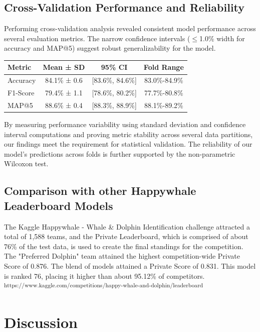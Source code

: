 \documentclass[twocolumn]{article}
\begin{document}
\subsection{Cross-Validation Performance and Reliability}

Performing cross-validation analysis revealed consistent model performance across several evaluation metrics. The narrow confidence intervals (\(\leq\)1.0\% width for accuracy and MAP@5) suggest robust generalizability for the model.

\begin{table}
\begin{tabular}{l c c c}
\hline
\textbf{Metric} & \textbf{Mean ± SD} & \textbf{95\% CI} & \textbf{Fold Range} \\ \hline
Accuracy & 84.1\% ± 0.6 & [83.6\%, 84.6\%] & 83.0\%-84.9\% \\
F1-Score & 79.4\% ± 1.1 & [78.6\%, 80.2\%] & 77.7\%-80.8\% \\
MAP@5 & 88.6\% ± 0.4 & [88.3\%, 88.9\%] & 88.1\%-89.2\% \\ \hline
\end{tabular}
\end{table}

By measuring performance variability using standard deviation and confidence interval computations and proving metric stability across several data partitions, our findings meet the requirement for statistical validation. The reliability of our model's predictions across folds is further supported by the non-parametric Wilcoxon test. 

\subsection{Comparison with other Happywhale Leaderboard Models}

The Kaggle Happywhale - Whale \& Dolphin Identification challenge attracted a total of 1,588 teams, and the Private Leaderboard, which is comprised of about 76\% of the test data, is used to create the final standings for the competition. The "Preferred Dolphin" team attained the highest competition-wide Private Score of 0.876. The blend of models attained a Private Score of 0.831. This model is ranked 76, placing it higher than about 95.12\% of competitors. \textsuperscript{https://www.kaggle.com/competitions/happy-whale-and-dolphin/leaderboard}

\section{Discussion}
\end{document}
